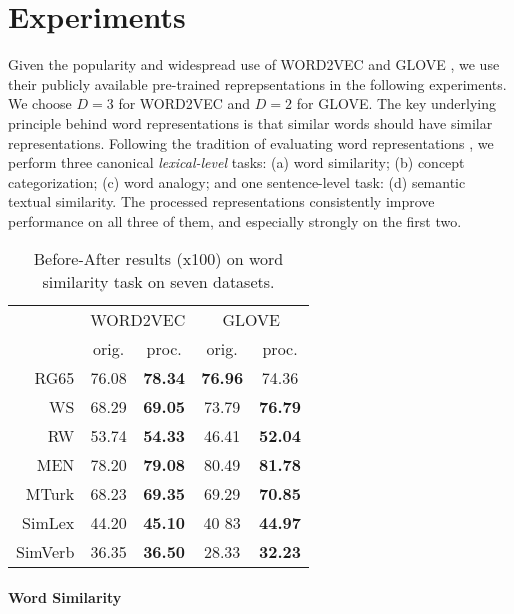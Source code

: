 \documentclass{article} \usepackage{acl2017,times}
\begin{document}
\section{Experiments}
\label{sec:experiments}
Given the popularity and widespread use of WORD2VEC \citep{mikolov2013efficient} and GLOVE \citep{pennington2014glove}, we use their publicly available pre-trained reprepsentations in the following experiments. We choose $D=3$ for WORD2VEC and $D=2$ for GLOVE. 
The key underlying principle behind word representations is that similar words should have similar representations. Following the tradition of evaluating word representations \citep{schnabel2015evaluation,baroni2014don}, we perform three canonical {\em lexical-level} tasks: (a) word similarity; (b) concept categorization; (c) word analogy; and one {\rm sentence-level} task: (d) semantic textual similarity. The processed representations consistently improve  performance on all three of them, and  especially strongly on the first two. 


\begin{wraptable}{l}{0.48\textwidth}
\vspace{-10pt}
\begin{tabular}{|r||c|c||c|c|}
\hline
\multirow{2}{*}{} & \multicolumn{2}{c||}{WORD2VEC} & \multicolumn{2}{c|}{GLOVE} \\ \cline{2-5} 
                  & orig.      & proc.     & orig.    & proc.    \\ \hline
RG65  &     76.08 &     \bf  78.34  &  \bf 76.96 &  74.36       \\ \hline
WS    &     68.29 &     \bf  69.05 &   73.79  &  \bf 76.79 \\ \hline
RW    &     53.74 &     \bf 54.33 &  46.41   &  \bf 52.04    \\ \hline
MEN   &     78.20 &     \bf 79.08 &  80.49   &  \bf 81.78     \\ \hline
MTurk &     68.23 &     \bf 69.35 &  69.29  &   \bf 70.85\\ \hline
SimLex  &   44.20 &   \bf 45.10   &   40
83 & \bf 44.97      \\ \hline
SimVerb &   36.35 &  \bf 36.50   &  28.33   &  \bf 32.23      \\ \hline
\end{tabular}
\caption{Before-After results (x100) on word similarity task on seven datasets.}
\label{tb:similarity}
\vspace{-10pt}
\end{wraptable}

\paragraph{Word Similarity} 
\end{document}
